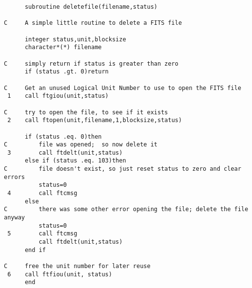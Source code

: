 \newpage
\begin{verbatim}
      subroutine deletefile(filename,status)

C     A simple little routine to delete a FITS file

      integer status,unit,blocksize
      character*(*) filename

C     simply return if status is greater than zero
      if (status .gt. 0)return

C     Get an unused Logical Unit Number to use to open the FITS file
 1    call ftgiou(unit,status)

C     try to open the file, to see if it exists
 2    call ftopen(unit,filename,1,blocksize,status)

      if (status .eq. 0)then
C         file was opened;  so now delete it 
 3        call ftdelt(unit,status)
      else if (status .eq. 103)then
C         file doesn't exist, so just reset status to zero and clear errors
          status=0
 4        call ftcmsg
      else
C         there was some other error opening the file; delete the file anyway
          status=0
 5        call ftcmsg
          call ftdelt(unit,status)
      end if

C     free the unit number for later reuse
 6    call ftfiou(unit, status)
      end
\end{verbatim}

